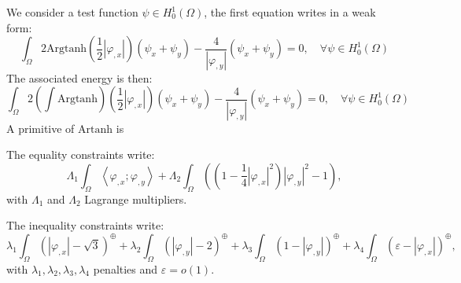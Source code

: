 We consider a test function $\psi \in H^1_0(\Omega)$, the first equation writes in a weak form:
\begin{equation}
\label{eq:weak form}
\int_{\Omega} 2\mathrm{Argtanh}(\frac12 |\varphi_{,x}|)(\psi_x + \psi_y) - \frac{4}{|\varphi_{,y}|}(\psi_x + \psi_y) = 0, \quad \forall \psi \in H^1_0(\Omega)
\end{equation}
The associated energy is then: 
\begin{equation}
\label{eq:energy}
\int_{\Omega} 2\left( \int \mathrm{Argtanh} \right)(\frac12 |\varphi_{,x}|)(\psi_x + \psi_y) - \frac{4}{|\varphi_{,y}|}(\psi_x + \psi_y) = 0, \quad \forall \psi \in H^1_0(\Omega)
\end{equation}
A primitive of $\mathrm{Artanh}$ is 

The equality constraints write:
\begin{equation}
\Lambda_1 \int_{\Omega} \left\langle \varphi_{,x} ; \varphi_{,y} \right\rangle + \Lambda_2 \int_{\Omega} \left( (1 - \frac14 |\varphi_{,x}|^2) |\varphi_{,y}|^2 - 1 \right),
\end{equation}
with $\Lambda_1$ and $\Lambda_2$ Lagrange multipliers.

The inequality constraints write:
\begin{equation}
\label{eq:inequality constraints energy}
\lambda_1 \int_{\Omega} \left(|\varphi_{,x}| - \sqrt{3} \right)^\oplus + \lambda_2 \int_{\Omega} \left(|\varphi_{,y}| - 2 \right)^\oplus + \lambda_3 \int_{\Omega} \left(1 - |\varphi_{,y}| \right)^\oplus + \lambda_4 \int_{\Omega} \left(\varepsilon - |\varphi_{,x}| \right)^\oplus,
\end{equation}
with $\lambda_1,\lambda_2,\lambda_3,\lambda_4$ penalties  and $\varepsilon = o(1)$.







